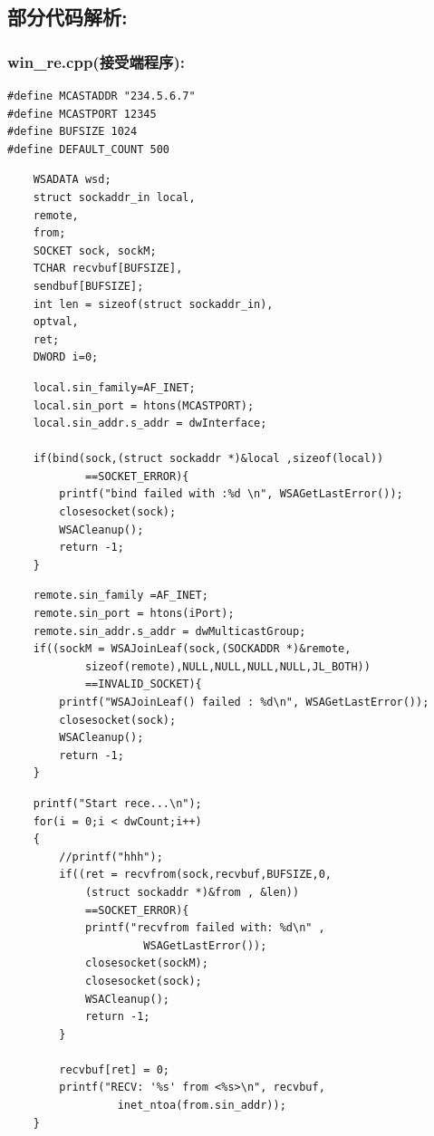 \documentclass[UTF8]{ctexart}
\begin{document}
\subsection{部分代码解析:}
\subsubsection{win\_{}re.cpp(接受端程序):}
\par{}
\par{
\begin{lstlisting}
#define MCASTADDR "234.5.6.7"
#define MCASTPORT 12345
#define BUFSIZE 1024
#define DEFAULT_COUNT 500
\end{lstlisting}
}

\par{}
\par{
\begin{lstlisting}
	WSADATA wsd;
	struct sockaddr_in local,
	remote,
	from;
	SOCKET sock, sockM;
	TCHAR recvbuf[BUFSIZE],
	sendbuf[BUFSIZE];
	int len = sizeof(struct sockaddr_in),
	optval,
	ret;
	DWORD i=0;
\end{lstlisting}
}

\par{
\begin{lstlisting}
	local.sin_family=AF_INET;
	local.sin_port = htons(MCASTPORT);
	local.sin_addr.s_addr = dwInterface;
	
	if(bind(sock,(struct sockaddr *)&local ,sizeof(local))
			==SOCKET_ERROR){
		printf("bind failed with :%d \n", WSAGetLastError());
		closesocket(sock);
		WSACleanup();
		return -1;
	}

\end{lstlisting}
}

\par{
\begin{lstlisting}
	remote.sin_family =AF_INET;
	remote.sin_port = htons(iPort);
	remote.sin_addr.s_addr = dwMulticastGroup;
	if((sockM = WSAJoinLeaf(sock,(SOCKADDR *)&remote,
			sizeof(remote),NULL,NULL,NULL,NULL,JL_BOTH))
			==INVALID_SOCKET){
		printf("WSAJoinLeaf() failed : %d\n", WSAGetLastError());
		closesocket(sock);
		WSACleanup();
		return -1;
	}

\end{lstlisting}
}

\par{
\begin{lstlisting}
	printf("Start rece...\n");
	for(i = 0;i < dwCount;i++)
	{
		//printf("hhh");
		if((ret = recvfrom(sock,recvbuf,BUFSIZE,0, 
			(struct sockaddr *)&from , &len))
			==SOCKET_ERROR){
			printf("recvfrom failed with: %d\n" ,
					 WSAGetLastError());
			closesocket(sockM);
			closesocket(sock);
			WSACleanup();
			return -1;
		}
		
		recvbuf[ret] = 0;
		printf("RECV: '%s' from <%s>\n", recvbuf,
				 inet_ntoa(from.sin_addr));
	}
\end{lstlisting}
}
\end{document}
